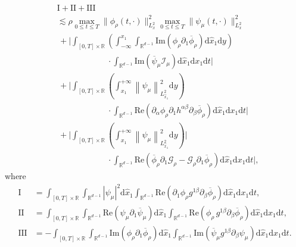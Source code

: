 \documentclass[11pt,letterpaper,reqno]{amsart}
\numberwithin{equation}{section}
\theoremstyle{definition}
\theoremstyle{remark}
\begin{document}
\begin{align}  \label{Bie}
	& \mathrm{I}+\mathrm{II}+\mathrm{III}\\
&\lesssim 	\rho \max_{0\leq t \leq T} \| \phi_\rho (t, \cdot) \|_{  L_x^2}^2  \max_{0\leq t \leq T} \|    \psi _\mu(t,\cdot )\|_{ L_x^2}^2 \label{biNt0}\\
	&\,+\Big|\int_{[0,T]\times \mathbb{R}}  \left( \int_{-\infty}^{x_1} \int_{\mathbb{R}^{d-1}}  \mathrm{Im}\left( \phi_{\rho } \partial_{1} \overline{\phi}_\rho\right) 
 \mathrm{d} \widehat{x}_1 \mathrm{ d} y\right) \label{biNt1}\\
 &\qquad\qquad\qquad  \cdot\int_{\mathbb{R}^{d-1}} \mathrm{Im} \left( \overline{ \psi}_\mu  \mathcal{I}_\mu    \right) \mathrm{d} \widehat{x}_1 \mathrm{ d} x_1 \mathrm{ d} t\Big| \nonumber\\
	&\,+\Big|\int_{[0,T]\times \mathbb{R}}  \left( \int^{+\infty}_{x_1}   \left\|\psi_\mu\right\|^2_{L^2_{\widehat{x}_1}}   \mathrm{ d} y\right )\label{non.bit1}\\
 &\qquad\qquad\qquad  \cdot\int_{\mathbb{R}^{d-1}}  \mathrm{Re}\left(\partial_{\alpha} \phi_\rho   \partial_1 h^{\alpha \beta} \partial_\beta \overline{\phi}_{\rho}\right)  \mathrm{d} \widehat{x}_1\mathrm{ d} x_1 \mathrm{ d} t \Big|\nonumber\\
	&\,+\Big|\int_{[0,T]\times \mathbb{R}}  \left( \int^{+\infty}_{x_1}   \left\|\psi_\mu\right\|^2_{L^2_{\widehat{x}_1}}   \mathrm{ d} y\right) 
 \Big|\label{non.bit2}\\
	&\qquad\qquad\qquad  \cdot \int_{\mathbb{R}^{d-1}} \mathrm{Re} \left(\overline{\phi}_\rho \partial_{1} \mathcal{G}_\rho - \mathcal{G}_\rho \partial_{1} \overline{\phi}_\rho\right)   \mathrm{d} \widehat{x}_1 \mathrm{ d} x_1 \mathrm{ d} t \Big|, \nonumber
\end{align}
where
\begin{align*}
	\mathrm{I}&=\int_{[0,T]\times \mathbb{R}} \int_{\mathbb{R}^{d-1}} |  \psi_\mu  |^2 	\mathrm{d} \widehat{x}_1 \int_{\mathbb{R}^{d-1}} \mathrm{Re} (\partial_{1} \phi_\rho   g^{1\beta} \partial_{\beta} \overline{\phi}_{\rho} ) \mathrm{d} \widehat{x}_1 \mathrm{ d} x_1 \mathrm{ d} t,\\
	\mathrm{II}&=\int_{[0,T]\times \mathbb{R}} \int_{\mathbb{R}^{d-1}} \mathrm{Re} (    \psi_\mu  \partial_{1}  \overline{\psi}_\mu   )	\mathrm{d} \widehat{x}_1 \int_{\mathbb{R}^{d-1}} \mathrm{Re} (\phi_\rho \,   g^{1\beta} \partial_{\beta} \overline{\phi}_{\rho} ) \mathrm{d} \widehat{x}_1 \mathrm{ d} x_1 \mathrm{ d} t,\\
	\mathrm{III}&=-\int_{[0,T]\times \mathbb{R}}  \int_{\mathbb{R}^{d-1}}  \mathrm{Im} ( \phi_{\rho } \partial_{1} \overline{\phi}_\rho ) \mathrm{d} \widehat{x}_1 \int_{\mathbb{R}^{d-1}}\mathrm{Im} ( \overline{\psi}_\mu g^{1\beta}    \partial_{\beta}\psi_\mu    ) \mathrm{d} \widehat{x}_1 \mathrm{ d} x_1 \mathrm{ d} t.
\end{align*}
\end{document}
